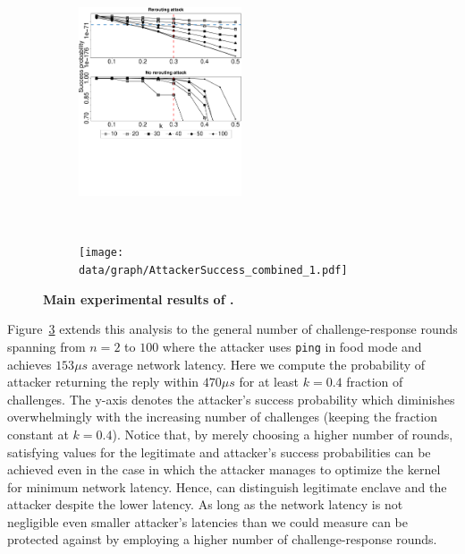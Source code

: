 \begin{figure}[t!]
    \centering
    \begin{subfigure}[t]{0.5\textwidth}
        \centering
        \includegraphics[trim={0 9.5cm 0 0}, clip,  height=2.2in]{data/graph/round_comp_2.pdf}
        \caption{\roundCompCaption}
        \label{graph:roundSuccess}
    \end{subfigure}%
    ~ ~~
    \begin{subfigure}[t]{0.5\textwidth}
        \centering
        \texttt{[image: data/graph/AttackerSuccess\_combined\_1.pdf]}
        \caption{\mainResultCaption}
        \label{graph:attackerSuccess}
    \end{subfigure}
    \caption{\textbf{Main experimental results of \name.}}
\end{figure}
\fi
%

\ifusenix
\vspace{-10pt}
\else
\fi
{} Figure~\ref{graph:attackerSuccess} extends this analysis to the general number of challenge-response rounds spanning from $n=2$ to $100$ where the attacker uses \texttt{ping} in food mode and achieves $153\mu s$ average network latency. Here we compute the probability of attacker returning the reply within $470 \mu s$ for at least $k=0.4$ fraction of challenges. The y-axis denotes the attacker's success probability which diminishes overwhelmingly with the increasing number of challenges (keeping the fraction constant at $k=0.4$). Notice that, by merely choosing a higher number of rounds, satisfying values for the legitimate and attacker's success probabilities can be achieved even in the case in which the attacker manages to optimize the kernel for minimum network latency. Hence, \name can distinguish legitimate enclave and the attacker despite the lower latency. As long as the network latency is not negligible even smaller attacker's latencies than we could measure can be protected against by employing a higher number of challenge-response rounds.


